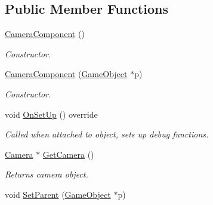 \subsection*{Public Member Functions}
\begin{DoxyCompactItemize}
\item 
\mbox{\label{class_camera_component_a6f14fb3dfa5ca8cfbaae2936413837d8}} 
\mbox{\hyperlink{class_camera_component_a6f14fb3dfa5ca8cfbaae2936413837d8}{Camera\+Component}} ()
\begin{DoxyCompactList}\small\item\em Constructor. \end{DoxyCompactList}\item 
\mbox{\label{class_camera_component_ac13478a138aae597e2a2383a23809993}} 
\mbox{\hyperlink{class_camera_component_ac13478a138aae597e2a2383a23809993}{Camera\+Component}} (\mbox{\hyperlink{class_game_object}{Game\+Object}} $\ast$p)
\begin{DoxyCompactList}\small\item\em Constructor. \end{DoxyCompactList}\item 
\mbox{\label{class_camera_component_acd54d4b23d9005e9774f1c18e5a770f4}} 
void \mbox{\hyperlink{class_camera_component_acd54d4b23d9005e9774f1c18e5a770f4}{On\+Set\+Up}} () override
\begin{DoxyCompactList}\small\item\em Called when attached to object, sets up debug functions. \end{DoxyCompactList}\item 
\mbox{\label{class_camera_component_a1dfd5d80dc742c0f5b4ffdee800ef65c}} 
\mbox{\hyperlink{class_camera}{Camera}} $\ast$ \mbox{\hyperlink{class_camera_component_a1dfd5d80dc742c0f5b4ffdee800ef65c}{Get\+Camera}} ()
\begin{DoxyCompactList}\small\item\em Returns camera object. \end{DoxyCompactList}\item 
\mbox{\label{class_camera_component_a7c539add4157eec66586dd6f9c8e6484}} 
void \mbox{\hyperlink{class_camera_component_a7c539add4157eec66586dd6f9c8e6484}{Set\+Parent}} (\mbox{\hyperlink{class_game_object}{Game\+Object}} $\ast$p)

\end{DoxyCompactItemize}
